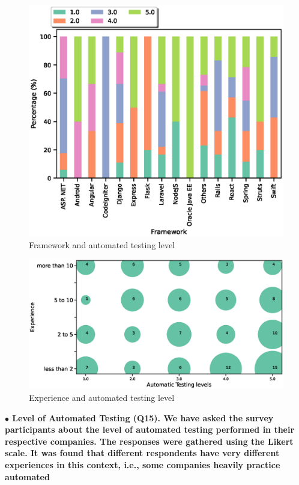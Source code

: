 \begin{figure}[h]
\centering
  \includegraphics[scale=0.65]{Figures/Framework_and_Test_Level}
  \caption{Framework and automated testing level}
  \label{fig:framework and autotest}
\end{figure}
\begin{figure}[h]
\centering
  \includegraphics[scale=0.45]{Figures/Auto_Test_and_Experience}
  \caption{Experience and automated testing level}
  \label{fig:experience and autotest}
\end{figure}
\nd\bf{$\bullet$ Level of Automated Testing (Q15).}
We have asked the survey participants about the level of automated testing
performed in their respective companies. The responses were gathered using the
Likert scale. It was found that different respondents have very different
experiences in this context, i.e., some companies heavily practice automated
